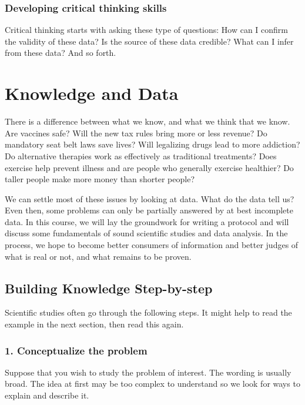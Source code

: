 \documentclass[11pt, chapterprefix=true]{scrbook}\usepackage[]{graphicx}\usepackage[]{color}
\begin{document}
\subsubsection{Developing critical thinking skills}

Critical thinking starts with asking these type of questions: How can I confirm the validity of these data? Is the source of these data credible?  What can I infer from these data?  And so forth.

\section{Knowledge and Data}

There is a difference between what we know, and what we think that we know.  Are vaccines safe?  Will the new tax rules bring more or less revenue?  Do mandatory seat belt laws save lives?   Will legalizing drugs lead to more addiction?  Do alternative therapies work as effectively as traditional treatments?  Does exercise help prevent illness and are people who generally exercise healthier? Do taller people make more money than shorter people?  \citep{naranjo2018}

We can settle most of these issues by looking at data.  What do the data tell us?  Even then, some problems can only be partially answered by at best incomplete data.  In this course, we will lay the groundwork for writing a protocol and  will discuss some fundamentals of sound scientific studies and data analysis.  In the process, we hope to become better consumers of information and better judges of what is real or not, and what remains to be proven.

\subsection{Building Knowledge Step-by-step}

Scientific studies often go through the following steps.  It might help to read the example in the next section, then read this again.

\subsubsection{1. Conceptualize the problem} 

Suppose that you wish to study the problem of interest.  The wording is usually broad. The idea at first may be too complex to understand so we look for ways to explain and describe it.
\end{document}

